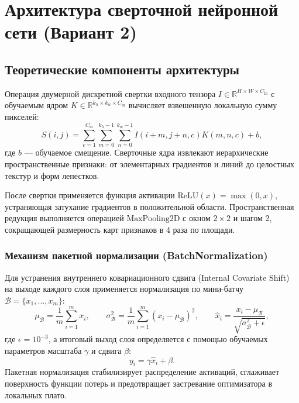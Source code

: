 \chapter{Архитектура сверточной нейронной сети (Вариант 2)}

\section{Теоретические компоненты архитектуры}

Операция двумерной дискретной свертки входного тензора $I \in \mathbb{R}^{H \times W \times C_{\text{in}}}$ с обучаемым ядром $K \in \mathbb{R}^{k_h \times k_w \times C_{\text{in}}}$ вычисляет взвешенную локальную сумму пикселей:
\begin{equation}
    S(i, j) = \sum_{c=1}^{C_{\text{in}}} \sum_{m=0}^{k_h - 1} \sum_{n=0}^{k_w - 1} I(i + m, j + n, c) K(m, n, c) + b,
    \label{eq:convolution}
\end{equation}
где $b$ --- обучаемое смещение. Сверточные ядра извлекают иерархические пространственные признаки: от элементарных градиентов и линий до целостных текстур и форм лепестков.

После свертки применяется функция активации $\text{ReLU}(x) = \max(0, x)$, устраняющая затухание градиентов в положительной области. Пространственная редукция выполняется операцией $\text{MaxPooling2D}$ с окном $2 \times 2$ и шагом 2, сокращающей размерность карт признаков в 4 раза по площади.

\subsection{Механизм пакетной нормализации (BatchNormalization)}

Для устранения внутреннего ковариационного сдвига (Internal Covariate Shift) на выходе каждого слоя применяется нормализация по мини-батчу $\mathcal{B} = \{x_1, \dots, x_m\}$:
\begin{equation}
    \mu_\mathcal{B} = \frac{1}{m} \sum_{i=1}^m x_i, \qquad \sigma_\mathcal{B}^2 = \frac{1}{m} \sum_{i=1}^m (x_i - \mu_\mathcal{B})^2, \qquad \hat{x}_i = \frac{x_i - \mu_\mathcal{B}}{\sqrt{\sigma_\mathcal{B}^2 + \epsilon}},
    \label{eq:bn}
\end{equation}
где $\epsilon = 10^{-3}$, а итоговый выход слоя определяется с помощью обучаемых параметров масштаба $\gamma$ и сдвига $\beta$:
\begin{equation}
    y_i = \gamma \hat{x}_i + \beta.
    \label{eq:bn_out}
\end{equation}
Пакетная нормализация стабилизирует распределение активаций, сглаживает поверхность функции потерь и предотвращает застревание оптимизатора в локальных плато.

